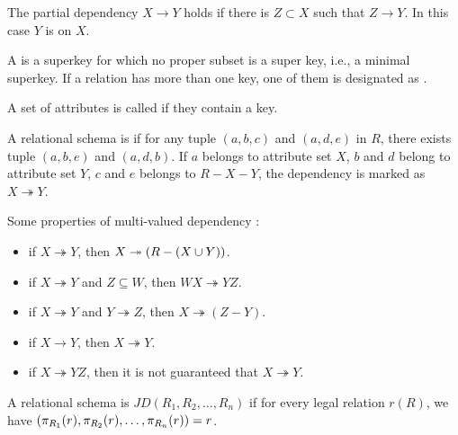\begin{definition}
    The partial dependency $X \rightarrow Y$ holds if there is $Z \subset X$ such that $Z \rightarrow Y$. In this case $Y$ is  on $X$.
\end{definition}

\begin{definition}[Key]
    A  is a superkey for which no proper subset is a super key, i.e., a minimal superkey. If a relation has more than one key, one of them is designated as .
\end{definition}

\begin{definition}[Superkey]
    A set of attributes is called  if they contain a key.
\end{definition}

\begin{definition}
    A relational schema is  \cite{Fagin1977} if for any tuple $(a,b,c)$ and $(a,d,e)$ in $R$, there exists tuple $(a,b,e)$ and $(a,d,b)$. If $a$ belongs to attribute set $X$, $b$ and $d$ belong to attribute set $Y$, $c$ and $e$ belongs to $R - X - Y$, the dependency is marked as $X \twoheadrightarrow Y$.
\end{definition}


\begin{theorem}
    Some properties of multi-valued dependency \cite{Beeri1977}:
    \begin{itemize}
        \item if $X \twoheadrightarrow Y$, then  $X \twoheadrightarrow \mleft(R - (X \cup Y) \mright)$.
        \item if $X \twoheadrightarrow Y$ and $Z \subseteq W$, then  $WX \twoheadrightarrow YZ$.
        \item if $X \twoheadrightarrow Y$ and  $Y \twoheadrightarrow Z$, then  $X \twoheadrightarrow (Z - Y)$.
        \item if $X \rightarrow Y$, then $X \twoheadrightarrow Y$.
        \item if $X \twoheadrightarrow YZ$, then it is not guaranteed that $X \twoheadrightarrow Y$.
    \end{itemize}    
\end{theorem}


\begin{definition}
    A relational schema is  $JD(R_1, R_2, \dots, R_n)$ if for every legal relation $r(R)$, we have $\mleft(\pi_{R_1} (r), \pi_{R_2}(r), \dots, \pi_{R_n}(r) \mright) = r$.
\end{definition}

